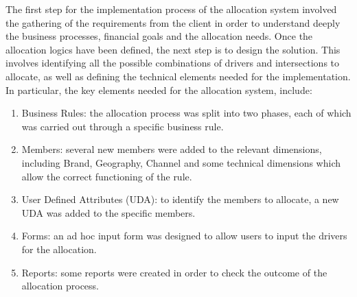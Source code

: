 \documentclass[12pt,a4paper,openright,twoside]{book}
\begin{document}
The first step for the implementation process of the allocation system involved the gathering of the requirements from the client in order to understand deeply the business processes, financial goals and the allocation needs.
%
Once the allocation logics have been defined, the next step is to design the solution.
%
This involves identifying all the possible combinations of drivers and intersections to allocate, as well as defining the technical elements needed for the implementation.
%
In particular, the key elements needed for the allocation system, include:

\begin{enumerate}
    \item Business Rules: the allocation process was split into two phases, each of which was carried out through a specific business rule.
    \item Members: several new members were added to the relevant dimensions, including Brand, Geography, Channel and some technical dimensions which allow the correct functioning of the rule.
    \item User Defined Attributes (UDA): to identify the members to allocate, a new UDA was added to the specific members.
    \item Forms: an ad hoc input form was designed to allow users to input the drivers for the allocation.
    \item Reports: some reports were created in order to check the outcome of the allocation process.
\end{enumerate}
\end{document}

